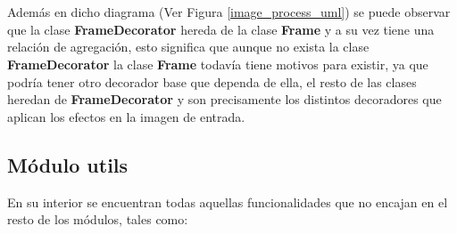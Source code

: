 \\
\\
Además en dicho diagrama (Ver Figura \ref{image_process_uml}) se puede observar que la clase \textbf{FrameDecorator} hereda de la clase \textbf{Frame} y a su vez tiene una relación de agregación, esto significa que aunque no exista la clase \textbf{FrameDecorator} la clase \textbf{Frame} todavía tiene motivos para existir, ya que podría tener otro decorador base que dependa de ella, el resto de las clases heredan de \textbf{FrameDecorator} y son precisamente los distintos decoradores que aplican los efectos en la imagen de entrada.
\subsection{Módulo utils}
En su interior se encuentran todas aquellas funcionalidades que no encajan en el resto de los módulos, tales como:
